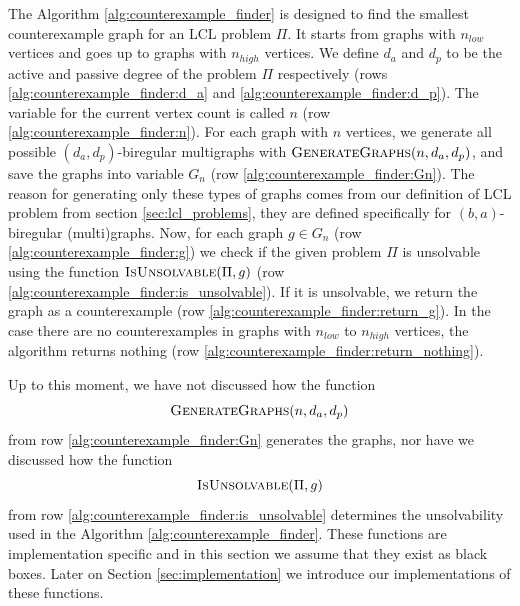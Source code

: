 The Algorithm \ref{alg:counterexample_finder} is designed to find the smallest counterexample graph for an LCL problem $\Pi$.
It starts from graphs with $n_{low}$ vertices and goes up to graphs with $n_{high}$ vertices.
We define $d_a$ and $d_p$ to be the active and passive degree of the problem $\Pi$ respectively (rows \ref{alg:counterexample_finder:d_a} and \ref{alg:counterexample_finder:d_p}).
The variable for the current vertex count is called $n$ (row \ref{alg:counterexample_finder:n}).
For each graph with $n$ vertices, we generate all possible $(d_a, d_p)$-biregular multigraphs with $\textsc{GenerateGraphs}(n, d_a, d_p)$, and save the graphs into variable $G_n$ (row \ref{alg:counterexample_finder:Gn}).
The reason for generating only these types of graphs comes from our definition of LCL problem from section \ref{sec:lcl_problems}, they are defined specifically for $(b,a)$-biregular (multi)graphs.
Now, for each graph $g \in G_n$ (row \ref{alg:counterexample_finder:g}) we check if the given problem $\Pi$ is unsolvable using the function $\textsc{IsUnsolvable}(\Pi, g)$ (row \ref{alg:counterexample_finder:is_unsolvable}).
If it is unsolvable, we return the graph as a counterexample (row \ref{alg:counterexample_finder:return_g}).
In the case there are no counterexamples in graphs with $n_{low}$ to $n_{high}$ vertices, the algorithm returns nothing (row \ref{alg:counterexample_finder:return_nothing}).

Up to this moment, we have not discussed how the function \[ \textsc{GenerateGraphs}(n, d_a, d_p) \] from row \ref{alg:counterexample_finder:Gn} generates the graphs, nor have we discussed how the function \[ \textsc{IsUnsolvable}(\Pi, g) \] from row \ref{alg:counterexample_finder:is_unsolvable} determines the unsolvability used in the Algorithm \ref{alg:counterexample_finder}.
These functions are implementation specific and in this section we assume that they exist as black boxes.
Later on Section \ref{sec:implementation} we introduce our implementations of these functions.



